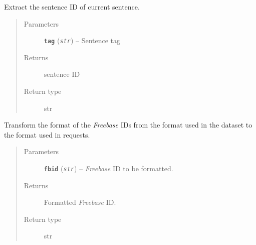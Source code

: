 \documentclass[letterpaper,10pt,english]{sphinxmanual}
\begin{document}

\begin{fulllineitems}
\label{src.misc:src.misc.helpers.extract_sentence_id}
Extract the sentence ID of current sentence.
\begin{quote}\begin{description}
\item[{Parameters}] \leavevmode
\textbf{\texttt{tag}} (\emph{\texttt{str}}) -- Sentence tag

\item[{Returns}] \leavevmode
sentence ID

\item[{Return type}] \leavevmode
str

\end{description}\end{quote}

\end{fulllineitems}


\begin{fulllineitems}
\label{src.misc:src.misc.helpers.format_fbid}
Transform the format of the \emph{Freebase} IDs from the format used in the dataset to the format used in requests.
\begin{quote}\begin{description}
\item[{Parameters}] \leavevmode
\textbf{\texttt{fbid}} (\emph{\texttt{str}}) -- \emph{Freebase} ID to be formatted.

\item[{Returns}] \leavevmode
Formatted \emph{Freebase} ID.

\item[{Return type}] \leavevmode
str

\end{description}\end{quote}

\end{fulllineitems}


\begin{fulllineitems}
\label{src.misc:src.misc.helpers.load_vectors}
\end{fulllineitems}
\end{document}
